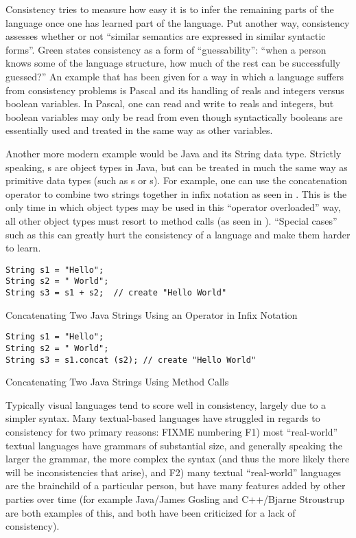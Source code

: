 Consistency tries to measure how easy it is to infer the remaining parts of the language once one has learned part of the language.  Put another way, consistency assesses whether or not ``similar semantics are expressed in similar syntactic forms''.\cite{green98}  Green states consistency as a form of ``guessability'': ``when a person knows some of the language structure, how much of the rest can be successfully guessed?''\cite{green96}  An example that has been given for a way in which a language suffers from consistency problems is Pascal and its handling of reals and integers versus boolean variables.  In Pascal, one can read and write to reals and integers, but boolean variables may only be read from even though syntactically booleans are essentially used and treated in the same way as other variables.

Another more modern example would be Java and its String data type.  Strictly speaking, s are object types in Java, but can be treated in much the same way as primitive data types (such as s or s).  For example, one can use the concatenation operator to combine two strings together in infix notation as seen in .  This is the only time in which object types may be used in this ``operator overloaded'' way, all other object types must resort to method calls (as seen in ).  ``Special cases'' such as this can greatly hurt the consistency of a language and make them harder to learn.

\begin{program}
\begin{verbatim}
String s1 = "Hello";
String s2 = " World";
String s3 = s1 + s2;  // create "Hello World" 
\end{verbatim}
\caption{Concatenating Two Java Strings Using an Operator in Infix Notation}
\label{prog:javainfix}
\end{program}

\begin{program}
\begin{verbatim}
String s1 = "Hello";
String s2 = " World";
String s3 = s1.concat (s2); // create "Hello World" 
\end{verbatim}
\caption{Concatenating Two Java Strings Using Method Calls}
\label{prog:javamethod}
\end{program}

Typically visual languages tend to score well in consistency, largely due to a simpler syntax.  Many textual-based languages have struggled in regards to consistency for two primary reasons: FIXME numbering F1) most ``real-world'' textual languages have grammars of substantial size, and generally speaking the larger the grammar, the more complex the syntax (and thus the more likely there will be inconsistencies that arise), and F2) many textual ``real-world'' languages are the brainchild of a particular person, but have many features added by other parties over time (for example Java/James Gosling and C++/Bjarne Stroustrup are both examples of this, and both have been criticized for a lack of consistency).
 
